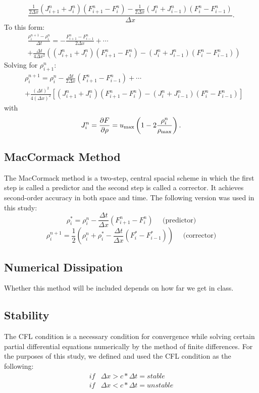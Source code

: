 \documentclass{article}
\begin{document}
\begin{equation}\frac{\frac{1}{2 \Delta x}(J^n_{i+1}+J^n_i)(F^n_{i+1}-F^n_i)-\frac{1}{2 \Delta x}(J^n_i+J^n_{i-1})(F^n_i-F^n_{i-1})}{\Delta x}.\end{equation}
To this form:
\begin{align}
&\frac{\rho_i^{n+1} - \rho_i^n}{\Delta t} =  
-\frac{F^n_{i+1}-F^n_{i-1}}{2 \Delta x} + \cdots \\ \nonumber 
&+ \frac{\Delta t}{4 \Delta x^2} \left( (J^n_{i+1}+J^n_i)(F^n_{i+1}-F^n_i)-(J^n_i+J^n_{i-1})(F^n_i-F^n_{i-1})\right)
\end{align}
Solving for $\rho^n_{i+1}$:
\begin{align}
&\rho_i^{n+1} = \rho_i^n - \frac{\Delta t}{2 \Delta x} \left(F^n_{i+1}-F^n_{i-1}\right) + \cdots \\ \nonumber 
&+ \frac{(\Delta t)^2}{4(\Delta x)^2} \left[ (J^n_{i+1}+J^n_i)(F^n_{i+1}-F^n_i)-(J^n_i+J^n_{i-1})(F^n_i-F^n_{i-1})\right]
\end{align}
with 
\begin{equation}J^n_i = \frac{\partial F}{\partial \rho} = u_{\rm max} \left(1-2\frac{\rho^n_i}{\rho_{\rm max}} \right).\end{equation}
\subsection{MacCormack Method}
The MacCormack method\cite{maccormack2003effect} is a two-step, central spacial scheme in which the first step is called a predictor and the second step is called a corrector. It achieves second-order accuracy in both space and time. The following version was used in this study:
\begin{equation}\rho^*_i = \rho^n_i - \frac{\Delta t}{\Delta x} (F^n_{i+1}-F^n_{i}) \ \ \ \ \ \ \text{(predictor)}\end{equation}
\begin{equation}\rho^{n+1}_i = \frac{1}{2} (\rho^n_i + \rho^*_i - \frac{\Delta t}{\Delta x} (F^*_i - F^{*}_{i-1})) \ \ \ \ \ \ \text{(corrector)}\end{equation}


\subsection{Numerical Dissipation}

Whether this method will be included depends on how far we get in class.  

\subsection{Stability}
The CFL condition is a necessary condition for convergence while solving certain partial differential equations numerically by the method of finite differences.\cite{courant1967partial} For the purposes of this study, we defined and used the CFL condition as the following:
\begin{align*}
if &\Delta x > c*\Delta t = stable\\
if &\Delta x < c*\Delta t = unstable
\end{align*}
\end{document}
